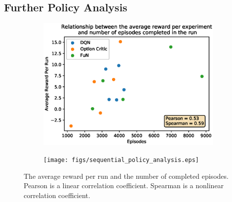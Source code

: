 \documentclass[notitlepage,a4paper,11pt]{article}
\begin{document}
\subsection{Further Policy Analysis}

\begin{figure}[htb!]
     \centering
     \begin{subfigure}{0.48\textwidth}
         \centering
         \includegraphics[width=\textwidth]{figs/good_policy.eps}
         \caption{}
         \label{fig:good_policy}
     \end{subfigure}
     \hfill
     \begin{subfigure}{0.48\textwidth}
         \centering
         \texttt{[image: figs/sequential\_policy\_analysis.eps]}
         \caption{}
         \label{fig:good_sequential_policy}
     \end{subfigure}
     \hfill
        \caption{The average reward per run and the number of completed episodes. Pearson is a linear correlation coefficient. Spearman is a nonlinear correlation coefficient.}
        \label{fig:all_results}      
\end{figure}
\end{document}
